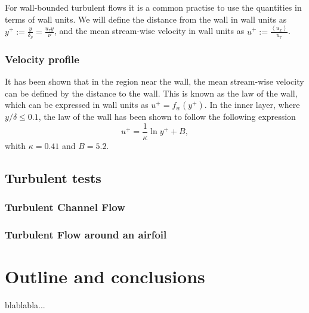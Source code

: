 For wall-bounded turbulent flows it is a common practise to use the quantities in terms of wall units. We will define the distance from the wall in wall units as $ y^+:=\frac{y}{\delta_\nu}=\frac{u_\tau y}{\nu} $, and the mean stream-wise velocity in wall units as $ u^+:=\frac{\left\langle u_x\right\rangle}{u_\tau} $.

\subsubsection{Velocity profile}
It has been shown that in the region near the wall, the mean stream-wise velocity can be defined by the distance to the wall. This is known as the law of the wall, which can be expressed in wall units as $ u^+=f_w(y^+) $. In the inner layer, where $ y/\delta\le0.1 $, the law of the wall has been shown to follow the following expression
\begin{equation}
\label{eq-wall_law}
u^+=\frac{1}{\kappa}\ln y^++B,
\end{equation}
whith $ \kappa=0.41 $ and $ B=5.2 $.

\subsection{Turbulent tests}
\subsubsection{Turbulent Channel Flow}
\subsubsection{Turbulent Flow around an airfoil}

\section{Outline and conclusions}

blablabla...
